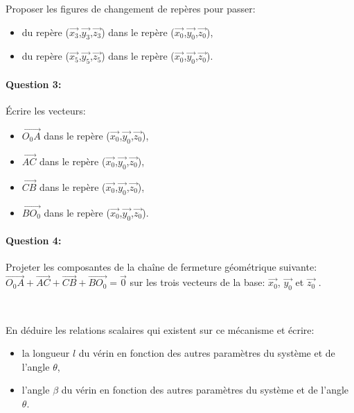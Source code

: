 Proposer les figures de changement de repères pour passer:
\begin{itemize}
 \item du repère ($\overrightarrow{x_3}$,$\overrightarrow{y_3}$,$\overrightarrow{z_3}$) dans le repère ($\overrightarrow{x_0}$,$\overrightarrow{y_0}$,$\overrightarrow{z_0}$),
 \item du repère ($\overrightarrow{x_5}$,$\overrightarrow{y_5}$,$\overrightarrow{z_5}$) dans le repère ($\overrightarrow{x_0}$,$\overrightarrow{y_0}$,$\overrightarrow{z_0}$).
\end{itemize}

\paragraph{Question 3:}

Écrire les vecteurs:
\begin{itemize}
 \item $\overrightarrow{O_0A}$ dans le repère ($\overrightarrow{x_0}$,$\overrightarrow{y_0}$,$\overrightarrow{z_0}$),
 \item $\overrightarrow{AC}$ dans le repère ($\overrightarrow{x_0}$,$\overrightarrow{y_0}$,$\overrightarrow{z_0}$),
 \item $\overrightarrow{CB}$ dans le repère ($\overrightarrow{x_0}$,$\overrightarrow{y_0}$,$\overrightarrow{z_0}$),
 \item $\overrightarrow{BO_0}$ dans le repère ($\overrightarrow{x_0}$,$\overrightarrow{y_0}$,$\overrightarrow{z_0}$).
\end{itemize}

\paragraph{Question 4:}

Projeter les composantes de la chaîne de fermeture géométrique suivante: $\overrightarrow{O_0A}+\overrightarrow{AC}+\overrightarrow{CB}+\overrightarrow{BO_0}=\overrightarrow{0}$ sur les trois vecteurs de la base: $\overrightarrow{x_0}$, $\overrightarrow{y_0}$ et $\overrightarrow{z_0}$ .

~\

En déduire les relations scalaires qui existent sur ce mécanisme et écrire:
\begin{itemize}
 \item la longueur $l$ du vérin en fonction des autres paramètres du système et de l'angle $\theta$,
 \item l'angle $\beta$ du vérin en fonction des autres paramètres du système et de l'angle $\theta$.
\end{itemize}

